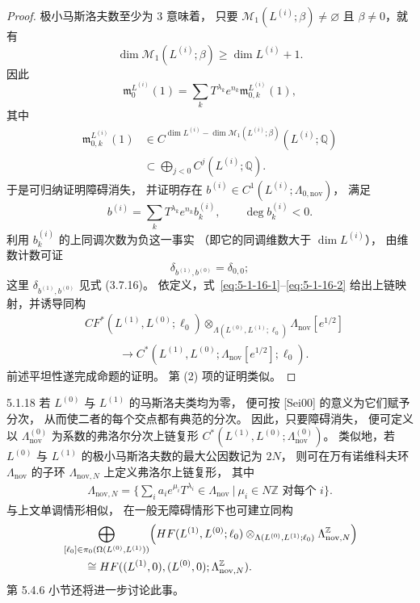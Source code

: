 \begin{proof}
极小马斯洛夫数至少为 $3$ 意味着，
只要 $\mathcal M_1(L^{(i)};\beta)\ne\varnothing$
且 $\beta\ne0$，就有
\[
\dim\mathcal M_1(L^{(i)};\beta)
\geq\dim L^{(i)}+1.
\]
因此
\[
\mathfrak m_0^{L^{(i)}}(1)
=\sum_k T^{\lambda_k}e^{n_k}
 \mathfrak m_{0,k}^{L^{(i)}}(1),
\]
其中
\[
\begin{aligned}
\mathfrak m_{0,k}^{L^{(i)}}(1)
&\in C^{\dim L^{(i)}-
\dim\mathcal M_1(L^{(i)};\beta)}
(L^{(i)};\mathbb Q)\\
&\subset\bigoplus_{j<0}C^j(L^{(i)};\mathbb Q).
\end{aligned}
\]
于是可归纳证明障碍消失，
并证明存在
$b^{(i)}\in C^1(L^{(i)};\Lambda_{0,\mathrm{nov}})$，
满足
\[
b^{(i)}=\sum_k T^{\lambda_k}e^{n_k}b_k^{(i)},
\qquad\deg b_k^{(i)}<0.
\]
利用 $b_k^{(i)}$ 的上同调次数为负这一事实
（即它的同调维数大于 $\dim L^{(i)}$），
由维数计数可证
\[
\delta_{b^{(1)},b^{(0)}}=\delta_{0,0};
\]
这里 $\delta_{b^{(1)},b^{(0)}}$
见式 (3.7.16)。
依定义，式~\eqref{eq:5-1-16-1}--\eqref{eq:5-1-16-2}
给出上链映射，并诱导同构
\[
\begin{aligned}
&CF^*(L^{(1)},L^{(0)};\ell_0)
\otimes_{\Lambda(L^{(0)},L^{(1)};\ell_0)}
\Lambda_{\mathrm{nov}}[e^{1/2}]\\
&\hspace{3em}\longrightarrow
C^*(L^{(1)},L^{(0)};
\Lambda_{\mathrm{nov}}[e^{1/2}];\ell_0).
\end{aligned}
\]
前述平坦性遂完成命题的证明。
第 \textup{(2)} 项的证明类似。
\end{proof}

\begin{remark}{5.1.18}\label{rem:5-1-18}
若 $L^{(0)}$ 与 $L^{(1)}$ 的马斯洛夫类均为零，
便可按 [Sei00] 的意义为它们赋予分次，
从而使二者的每个交点都有典范的分次。
因此，只要障碍消失，
便可定义以 $\Lambda_{\mathrm{nov}}^{(0)}$
为系数的弗洛尔分次上链复形
$C^*(L^{(1)},L^{(0)};
\Lambda_{\mathrm{nov}}^{(0)})$。
类似地，若 $L^{(0)}$ 与 $L^{(1)}$
的极小马斯洛夫数的最大公因数记为 $2N$，
则可在万有诺维科夫环
$\Lambda_{\mathrm{nov}}$ 的子环
$\Lambda_{\mathrm{nov},N}$ 上定义弗洛尔上链复形，
其中
\[
\begin{aligned}
\Lambda_{\mathrm{nov},N}
=\biggl\{\sum_i a_i e^{\mu_i}T^{\lambda_i}
\in\Lambda_{\mathrm{nov}}\ \bigg|\ 
\mu_i\in N\mathbb Z\text{ 对每个 }i\biggr\}.
\end{aligned}
\]
与上文单调情形相似，
在一般无障碍情形下也可建立同构
\[
\begin{aligned}
&\bigoplus_{[\ell_0]\in
 \pi_0(\Omega(L^{(0)},L^{(1)}))}
\Bigl(
HF(L^{(1)},L^{(0)};\ell_0)
\otimes_{\Lambda(L^{(0)},L^{(1)};\ell_0)}
\Lambda_{\mathrm{nov},N}^{\mathbb Z}
\Bigr)\\
&\hspace{2em}\cong
HF((L^{(1)},0),(L^{(0)},0);
\Lambda_{\mathrm{nov},N}^{\mathbb Z}).
\end{aligned}
\]
第 5.4.6 小节还将进一步讨论此事。
\end{remark}
